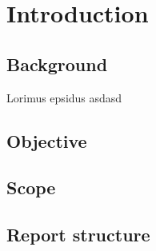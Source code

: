 \chapter*{Introduction}

\section{Background}
Lorimus epsidus asdasd

\section{Objective}

\section{Scope}

\section{Report structure}

